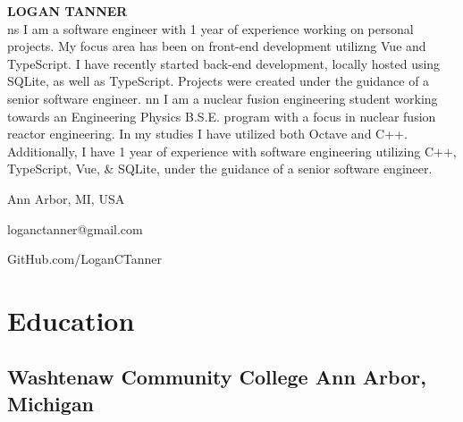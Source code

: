 \documentclass[10pt]{article} %
\newcommand\profSumFlag{n}
\newcommand\profSum[1]{
    \if \profSumFlag s 
        {
            I am a software engineer with 1 year of experience working on personal 
            projects. My focus area has been on front-end development utilizng
            Vue and TypeScript. I have recently started back-end development, locally
            hosted using SQLite, as well as TypeScript. Projects were created under 
            the guidance of a senior software engineer. 
        }
    \fi
    \if \profSumFlag n
        {
            I am a nuclear fusion engineering student working towards an Engineering 
            Physics B.S.E. program with a focus in nuclear fusion reactor 
            engineering. In my studies I have utilized both Octave and C++. 
            Additionally, I have 1 year of experience with software engineering 
            utilizing C++, TypeScript, Vue, \& SQLite, under the guidance of a 
            senior software engineer.
        }        
    \fi
}
\begin{document}
\begin{center}
    \begin{minipage}{0.55\textwidth}
        {\huge\bfseries
            LOGAN TANNER
        } \\ 
        \profSum \\ \medskip
    \end{minipage} \hfill
    \begin{minipage}{0.4\textwidth}
        \raggedleft
        \begin{description}[style=multiline, leftmargin=2cm]
            \item[Residence] Ann Arbor, MI, USA
            \item[Email] loganctanner@gmail.com
            \item[Mobile] 
            \item[GitHub] GitHub.com/LoganCTanner
        \end{description}
    \end{minipage}
\end{center}

\section{Education}
\subsection{Washtenaw Community College \hfill Ann Arbor, Michigan}
\end{document}
